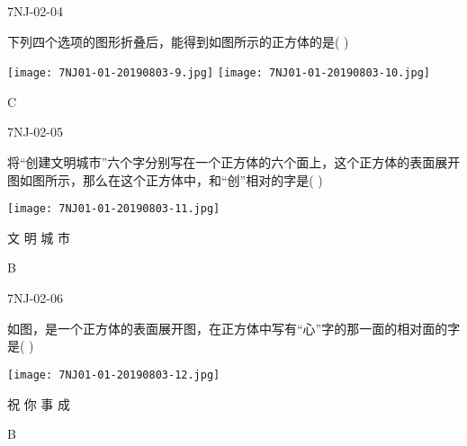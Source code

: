 \begin{defproblem}{7NJ-02-04}%
\begin{onlyproblem}%
下列四个选项的图形折叠后，能得到如图所示的正方体的是(    ) 
\begin{center}
\texttt{[image: 7NJ01-01-20190803-9.jpg]}
\texttt{[image: 7NJ01-01-20190803-10.jpg]}
\end{center}


\end{onlyproblem}%
\begin{onlysolution}%
\begin{solution}%
C
\end{solution}%
\end{onlysolution}%
\end{defproblem}



\begin{defproblem}{7NJ-02-05}%
\begin{onlyproblem}%
将“创建文明城市”六个字分别写在一个正方体的六个面上，这个正方体的表面展开图如图所示，那么在这个正方体中，和“创”相对的字是(    ) 
\begin{center}
\texttt{[image: 7NJ01-01-20190803-11.jpg]}
\end{center}

\xx
{文}
{明}
{城}
{市}

\end{onlyproblem}%
\begin{onlysolution}%
\begin{solution}%
B
\end{solution}%
\end{onlysolution}%
\end{defproblem}




\begin{defproblem}{7NJ-02-06}%
\begin{onlyproblem}%
如图，是一个正方体的表面展开图，在正方体中写有“心”字的那一面的相对面的字是(    ) 
\begin{center}
\texttt{[image: 7NJ01-01-20190803-12.jpg]}
\end{center}

\xx
{祝}
{你}
{事}
{成}

\end{onlyproblem}%
\begin{onlysolution}%
\begin{solution}%
B
\end{solution}%
\end{onlysolution}%
\end{defproblem}



